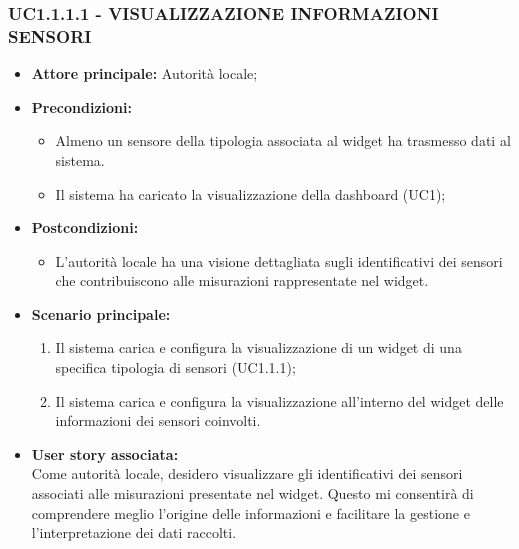 \subsubsection{UC1.1.1.1 - VISUALIZZAZIONE INFORMAZIONI SENSORI}
\begin{itemize}
    \item \textbf{Attore principale:} Autorità locale;
    \item \textbf{Precondizioni:}
        \begin{itemize}
            \item Almeno un sensore della tipologia associata al widget ha trasmesso dati al sistema.
            \item Il sistema ha caricato la visualizzazione della dashboard (UC1);
        \end{itemize}
    \item \textbf{Postcondizioni:}
        \begin{itemize}
            \item L’autorità locale ha una visione dettagliata sugli identificativi dei sensori che contribuiscono alle misurazioni rappresentate nel widget.
        \end{itemize}
    \item \textbf{Scenario principale:}
        \begin{enumerate}
            \item Il sistema carica e configura la visualizzazione di un widget di una specifica tipologia di sensori (UC1.1.1);
            \item Il sistema carica e configura la visualizzazione all'interno del widget delle informazioni dei sensori coinvolti.
        \end{enumerate}
    \item \textbf{User story associata:} \\
        Come autorità locale, desidero visualizzare gli identificativi dei sensori associati alle misurazioni presentate nel widget. Questo mi consentirà di comprendere meglio l'origine delle informazioni e facilitare la gestione e l'interpretazione dei dati raccolti.
\end{itemize}

